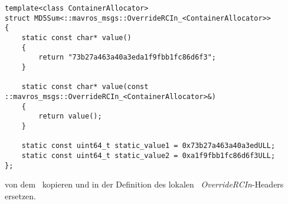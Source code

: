 \begin{lstlisting}[style=Style_CPP, numbers=none, caption=Definition des Struct \CodeStruct{MD5Sum} für das Template \textit{OverrideRCIn}]
template<class ContainerAllocator>
struct MD5Sum<::mavros_msgs::OverrideRCIn_<ContainerAllocator>>
{
	static const char* value()
	{
		return "73b27a463a40a3eda1f9fbb1fc86d6f3";
	}

	static const char* value(const ::mavros_msgs::OverrideRCIn_<ContainerAllocator>&)
	{
		return value();
	}
	
	static const uint64_t static_value1 = 0x73b27a463a40a3edULL;
	static const uint64_t static_value2 = 0xa1f9fbb1fc86d6f3ULL;
};
\end{lstlisting}

von dem \Pie\ kopieren und in der Definition des lokalen \ROS\ \textit{\mbox{OverrideRCIn}}-Headers ersetzen.








